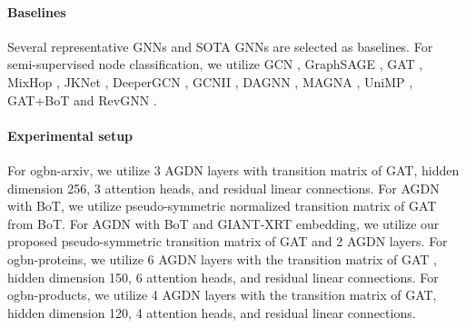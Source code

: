 \documentclass{article}
\begin{document}
\paragraph{Baselines}
Several representative GNNs and SOTA GNNs are selected as baselines. For semi-supervised node classification, we utilize GCN \cite{kipf2016semi}, GraphSAGE \cite{hamilton2017inductive}, GAT \cite{velivckovic2017graph}, MixHop \cite{abu2019mixhop}, JKNet \cite{xu2018representation}, DeeperGCN \cite{li2020deepergcn}, GCNII \cite{chen2020simple}, DAGNN \cite{liu2020towards}, MAGNA \cite{wang2020direct}, UniMP \cite{shi2020masked}, GAT+BoT \cite{wang2021bag} and RevGNN \cite{li2021training}. 

\paragraph{Experimental setup}
For ogbn-arxiv, we utilize 3 AGDN layers with transition matrix of GAT, hidden dimension 256, 3 attention heads, and residual linear connections. For AGDN with BoT, we utilize pseudo-symmetric normalized transition matrix of GAT from BoT. For AGDN with BoT and GIANT-XRT embedding, we utilize our proposed pseudo-symmetric transition matrix of GAT and 2 AGDN layers. For ogbn-proteins, we utilize 6 AGDN layers with the transition matrix of GAT , hidden dimension 150, 6 attention heads, and residual linear connections. For ogbn-products, we utilize 4 AGDN layers with the transition matrix of GAT, hidden dimension 120, 4 attention heads, and residual linear connections.
\end{document}
